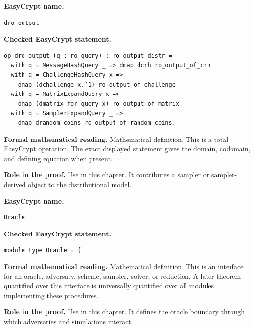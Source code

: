 \begin{formaldefinition}
\noindent\textbf{EasyCrypt name.}
\begin{lstlisting}[language=EasyCrypt,basicstyle=\ttfamily\scriptsize]
dro_output
\end{lstlisting}
\noindent\textbf{Checked EasyCrypt statement.}
\begin{lstlisting}[language=EasyCrypt,basicstyle=\ttfamily\scriptsize]
op dro_output (q : ro_query) : ro_output distr =
  with q = MessageHashQuery _ => dmap dcrh ro_output_of_crh
  with q = ChallengeHashQuery x =>
    dmap (dchallenge x.`1) ro_output_of_challenge
  with q = MatrixExpandQuery x =>
    dmap (dmatrix_for_query x) ro_output_of_matrix
  with q = SamplerExpandQuery _ =>
    dmap drandom_coins ro_output_of_random_coins.
\end{lstlisting}
\noindent\textbf{Formal mathematical reading.}
Mathematical definition. This is a total EasyCrypt operation.  The exact displayed statement gives the domain, codomain, and defining equation when present.

\noindent\textbf{Role in the proof.}
Use in this chapter. It contributes a sampler or sampler-derived object to the distributional model.

\end{formaldefinition}

\begin{formaldefinition}
\noindent\textbf{EasyCrypt name.}
\begin{lstlisting}[language=EasyCrypt,basicstyle=\ttfamily\scriptsize]
Oracle
\end{lstlisting}
\noindent\textbf{Checked EasyCrypt statement.}
\begin{lstlisting}[language=EasyCrypt,basicstyle=\ttfamily\scriptsize]
module type Oracle = {
\end{lstlisting}
\noindent\textbf{Formal mathematical reading.}
Mathematical definition. This is an interface for an oracle, adversary, scheme, sampler, solver, or reduction.  A later theorem quantified over this interface is universally quantified over all modules implementing these procedures.

\noindent\textbf{Role in the proof.}
Use in this chapter. It defines the oracle boundary through which adversaries and simulations interact.

\end{formaldefinition}

